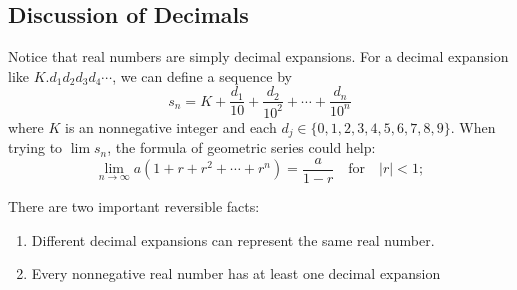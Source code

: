 \documentclass[12pt, lettersize]{book}
\theoremstyle{plain}
\theoremstyle{definition}
\theoremstyle{remark}
\begin{document}
		\subsection*{Discussion of Decimals}
		Notice that real numbers are simply decimal expansions. For a decimal expansion like $K.d_1d_2d_3d_4\cdots$, we can define a sequence by
		\begin{displaymath}
			s_n=K+\frac{d_1}{10}+\frac{d_2}{10^2}+\cdots+\frac{d_n}{10^n}
		\end{displaymath} 
		where $K$ is an nonnegative integer and each $d_j\in\{0,1,2,3,4,5,6,7,8,9\}$. When trying to $\lim s_n$, the formula
		of geometric series could help:
		\begin{displaymath}
			\lim\limits_{n\rightarrow\infty}a(1+r+r^2+\cdots+r^n)=\frac{a}{1-r}\quad \text{for}\quad |r|<1;
		\end{displaymath}
		
		There are two important reversible facts:
		\begin{enumerate}
			\item Different decimal expansions can represent the same real number.
			\item Every nonnegative real number has at least one decimal expansion
		\end{enumerate}\bigskip
\end{document}
